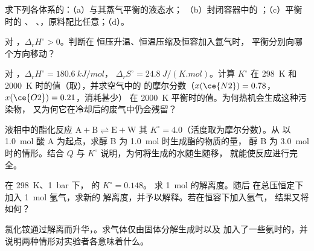 \begin{exercise}[$\star$]\label{exo:b2:equilibrium-shifts:3}
求下列各体系的：（a）与其蒸气平衡的液态水；
（b）封闭容器中的 ；（c）平衡时的 、
、，原料配比任意；（d）。
\end{exercise}

\begin{exercise}[$\star$]\label{exo:b2:equilibrium-shifts:4}
对 ，$\Delta_r H^\circ > 0$。判断在
恒压升温、恒温压缩及恒容加入氩气时，
平衡分别向哪个方向移动？
\end{exercise}

\begin{exercise}[$\star\star$]\label{exo:b2:equilibrium-shifts:5}
对 ，$\Delta_r H^\circ = \qty{180.6}{kJ/mol}$，
$\Delta_r S^\circ = \qty{24.8}{J/(K.mol)}$。计算 $K^\circ$ 在 \qty{298}{K}
和 \qty{2000}{K} 时的值（取），并求空气中的
 的摩尔分数（$x(\ce{N2}) = 0.78$，$x(\ce{O2}) = 0.21$，消耗甚少）
在 \qty{2000}{K} 平衡时的值。为何热机会生成这种污染物，
又为何它在冷却后的废气中仍会残留？
\end{exercise}

\begin{exercise}[$\star\star$]\label{exo:b2:equilibrium-shifts:6}
液相中的酯化反应 $\mathrm{A + B \rightleftharpoons E + W}$
其 $K^\circ = 4.0$（活度取为摩尔分数）。从
以 \qty{1.0}{mol} 酸 A 为起点，求醇 B 为 \qty{1.0}{mol} 时生成酯的物质的量，
醇 B 为 \qty{3.0}{mol} 时的情形。结合 $Q$ 与 $K^\circ$ 说明，为何将生成的水随生随移，
就能使反应进行完全。
\end{exercise}

\begin{exercise}[$\star\star$]\label{exo:b2:equilibrium-shifts:7}
在 \qty{298}{K}、\qty{1}{bar} 下， 的 $K^\circ = 0.148$。
求 \qty{1}{mol}  的解离度。随后
在总压恒定下加入 \qty{1}{mol} 氩气，求新的
解离度，并予以解释。若在恒容下加入氩气，
结果又将如何？
\end{exercise}

\begin{exercise}[$\star\star$]\label{exo:b2:equilibrium-shifts:8}
氯化铵通过解离而升华，。求气体仅由固体分解生成时以及
加入了一些氨时的，并说明两种情形对实验者各意味着什么。
\end{exercise}

